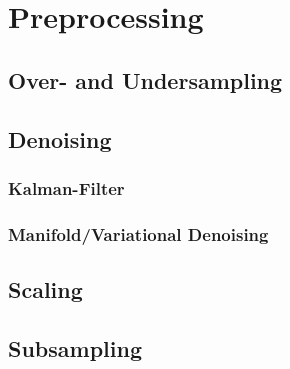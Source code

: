 \chapter{Preprocessing}
\label{chapter:preprocessing}

\section{Over- and Undersampling}
\section{Denoising}
\subsection{Kalman-Filter}
\subsection{Manifold/Variational Denoising}
\section{Scaling}
\section{Subsampling}
